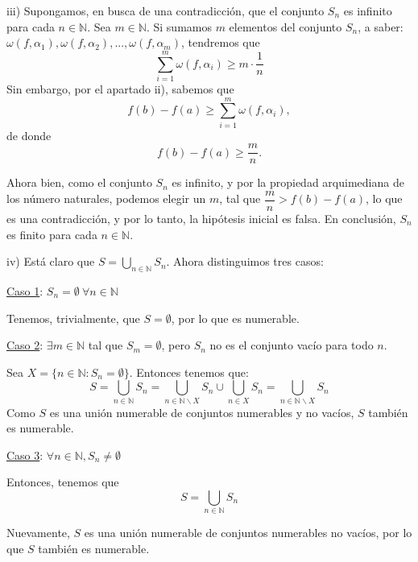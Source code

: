 \documentclass[10pt,a4paper]{article}
\begin{document}
	iii) Supongamos, en busca de una contradicción, que el conjunto $S_n$ es infinito para cada $n \in \mathbb{N}$. Sea $m \in \mathbb{N}$. Si sumamos $m$ elementos del conjunto $S_n$, a saber: $\omega(f, \alpha_1), \omega(f, \alpha_2), ... , \omega(f, \alpha_m)$, tendremos que
	$$\sum_{i = 1}^{m} \omega(f, \alpha_i) \geq m \cdot \dfrac{1}{n}$$
	Sin embargo, por el apartado ii), sabemos que $$f(b)-f(a) \geq \sum_{i = 1}^{m} \omega(f, \alpha_i),$$ de donde $$f(b)-f(a) \geq \dfrac{m}{n}.$$
	
	Ahora bien, como el conjunto $S_n$ es infinito, y por la propiedad arquimediana de los número naturales, podemos elegir un $m$, tal que $\dfrac{m}{n} > f(b)-f(a)$, lo que es una contradicción, y por lo tanto, la hipótesis inicial es falsa. En conclusión, $S_n$ es finito para cada $n \in \mathbb{N}$. \newline
	
	iv) Está claro que $S = \bigcup_{n \in \mathbb{N}}S_n$. Ahora distinguimos tres casos: \newline
	
	\underline{Caso 1}: $S_n = \emptyset ~ \forall n \in \mathbb{N}$
	
	Tenemos, trivialmente, que $S = \emptyset$, por lo que es numerable. \newline
	
	\underline{Caso 2}: $\exists m \in \mathbb{N}$ tal que $S_m = \emptyset$, pero $S_n$ no es el conjunto vacío para todo $n$.
	
	Sea $X = \{n \in \mathbb{N} : S_n = \emptyset\}$. Entonces tenemos que:
	$$S = \bigcup_{n \in \mathbb{N}}S_n = \bigcup_{n \in \mathbb{N} \backslash X}S_n \cup \bigcup_{n \in X}S_n = \bigcup_{n \in \mathbb{N} \backslash X}S_n$$
	Como $S$ es una unión numerable de conjuntos numerables y no vacíos, $S$ también es numerable. \newline
	
	\underline{Caso 3}: $\forall n \in \mathbb{N}, S_n \neq \emptyset$
	
	Entonces, tenemos que $$S = \bigcup_{n \in \mathbb{N}}S_n$$
	
	Nuevamente, $S$ es una unión numerable de conjuntos numerables no vacíos, por lo que $S$ también es numerable.
\end{document}

